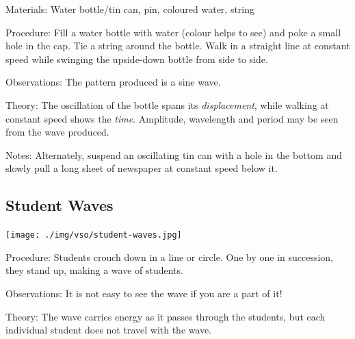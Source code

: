 \begin{multicols}{2}
\begin{description*}
\item[Materials:]{Water bottle/tin can, pin, coloured water, string}
\item[Procedure:]{Fill a water bottle with water (colour helps to see) and poke a small hole in the cap. Tie a string around the bottle. Walk in a straight line at constant speed while swinging the upside-down bottle from side to side.}
\item[Observations:]{The pattern produced is a sine wave.}
\item[Theory:]{The oscillation of the bottle spans its \emph{displacement}, while walking at constant speed shows the \emph{time}. Amplitude, wavelength and period may be seen from the wave produced.}
\item[Notes:]{Alternately, suspend an oscillating tin can with a hole in the bottom and slowly pull a long sheet of newspaper at constant speed below it.}
\end{description*}

\subsection{Student Waves}

\begin{center}
\texttt{[image: ./img/vso/student-waves.jpg]}
\end{center}

\begin{description*}
\item[Procedure:]{Students crouch down in a line or circle. One by one in succession, they stand up, making a wave of students.}
\item[Observations:]{It is not easy to see the wave if you are a part of it!}
\item[Theory:]{The wave carries energy as it passes through the students, but each individual student does not travel with the wave.}
\end{description*}


\end{multicols}

